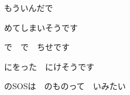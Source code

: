 \documentclass[a4paper,tate,twocolumn,12pt]{ltjtarticle}
\begin{document}
\begin{flushleft}
\vspace{2em}

\noindent\begin{minipage}{\linewidth}
もういんだで

めてしまいそうです

で　で　ちせです

にをった　にけそうです

のSOSは　のものって　いみたい
\end{minipage}

\end{flushleft}
\end{document}
